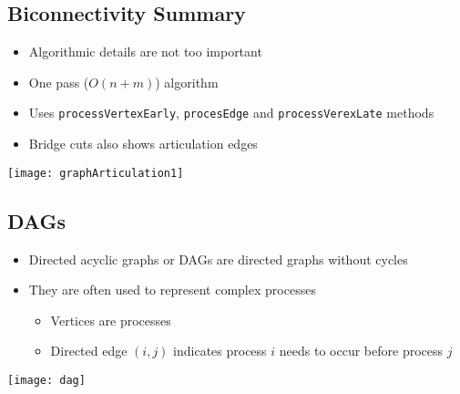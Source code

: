 \begin{slide}
\section{Biconnectivity Summary}

\begin{minipage}{0.55\linewidth}
  \begin{PauseHighLight}
  \begin{itemize}\raggedright
  \item Algorithmic details are not too important\pause
  \item One pass ($O(n+m)$) algorithm\pause
  \item Uses \texttt{processVertexEarly}, \texttt{procesEdge} and
    \texttt{processVerexLate} methods\pause
  \item Bridge cuts also shows articulation edges\pause
  \end{itemize}
\end{PauseHighLight}

\end{minipage}\hfill
\begin{minipage}{0.4\linewidth}
  \texttt{[image: graphArticulation1]}\pause
  \pauseb
\end{minipage}

\end{slide}

\Outline %

\begin{slide}
\section[-2]{DAGs}

\begin{PauseHighLight}
  \begin{itemize}
  \item Directed acyclic graphs or DAGs are directed graphs without
    cycles\pause
  \item They are often used to represent complex processes
    \begin{itemize}
    \item Vertices are processes
    \item Directed edge $(i,j)$ indicates process $i$ needs to occur
      before process $j$\pause
    \end{itemize}
  \end{itemize}
  \begin{center}
    \texttt{[image: dag]}
  \end{center}
\end{PauseHighLight}

\end{slide}



